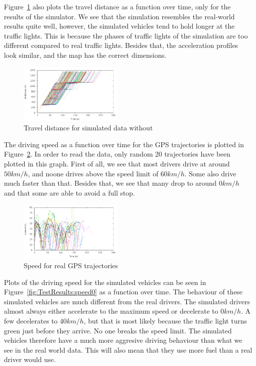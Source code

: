 Figure~\ref{fig:TestResults:distance0} also plots the travel distance as a function over time, only for the results of the simulator.
We see that the simulation resembles the real-world results quite well, however, the simulated vehicles tend to hold longer at the traffic lights. 
This is because the phases of traffic lights of the simulation are too different compared to real traffic lights. 
Besides that, the acceleration profiles look similar, and the map has the correct dimensions.

\begin{figure}[htb]
\includegraphics[width=0.45\textwidth]{../images/tp0c0_8/distanceUncontrolled0.png}
\caption{Travel distance for simulated data without \tech}
\label{fig:TestResults:distance0}
\end{figure}

The driving speed as a function over time for the GPS trajectories is plotted in Figure~\ref{fig:TestResults:RealSpeed}.
In order to read the data, only random 20 trajectories have been plotted in this graph.
First of all, we see that most drivers drive at around $50 km/h$, and noone drives above the speed limit of $60 km/h$. 
Some also drive much faster than that.
Besides that, we see that many drop to around $0 km/h$ and that some are able to avoid a full stop.

\begin{figure}[htb]
\includegraphics[width=0.45\textwidth]{../images/Real/RealSpeed.png}
\caption{Speed for real GPS trajectories}
\label{fig:TestResults:RealSpeed}
\end{figure}

Plots of the driving speed for the simulated vehicles can be seen in Figure~\ref{fig:TestResults:speed0} as a function over time.
The behaviour of these simulated vehicles are much different from the real drivers.
The simulated drivers almost always either accelerate to the maximum speed or decelerate to $0 km/h$. 
A few decelerates to $40 km/h$, but that is most likely because the traffic light turns green just before they arrive.
No one breaks the speed limit.
The simulated vehicles therefore have a much more aggresive driving behaviour than what we see in the real world data.
This will also mean that they use more fuel than a real driver would use.

